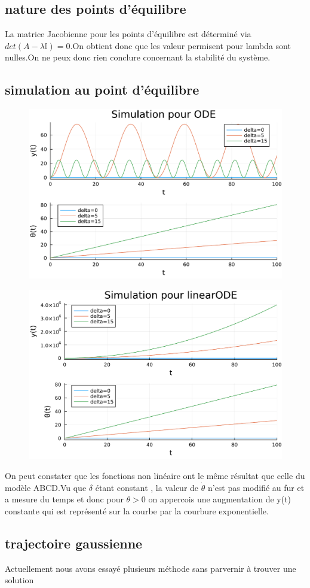 \documentclass[11pt,a4paper]{article}
\begin{document}
    \subsection{nature des points d'équilibre}
La matrice Jacobienne pour les points d'équilibre est déterminé via
$ det(A-\lambda \mathbb{I})=0 $.On obtient donc que les valeur permisent pour lambda sont nulles.On ne peux donc rien conclure concernant la stabilité du système.
\subsection{simulation au point d'équilibre}



\begin{figure}[!h]
    \centering
    \includegraphics[width=0.5\linewidth]{jlplots/Q1_7_ODE.pdf}
\end{figure}
\begin{figure}[!h]
    \centering
    \includegraphics[width=0.5\linewidth]{jlplots/Q1_7_linearODE.pdf}
\end{figure}
On peut constater que les fonctions non linéaire ont le même résultat que celle du modèle ABCD.Vu que $\delta$ étant constant , la valeur de $\dot \theta$ n'est pas modifié au fur et a mesure du temps et donc pour $\theta>0 $ on appercois une augmentation de y(t) constante qui est représenté sur la courbe par la courbure exponentielle.










\subsection{trajectoire gaussienne}
Actuellement nous avons essayé plusieurs méthode sans parvernir à trouver une solution 
\end{document}
